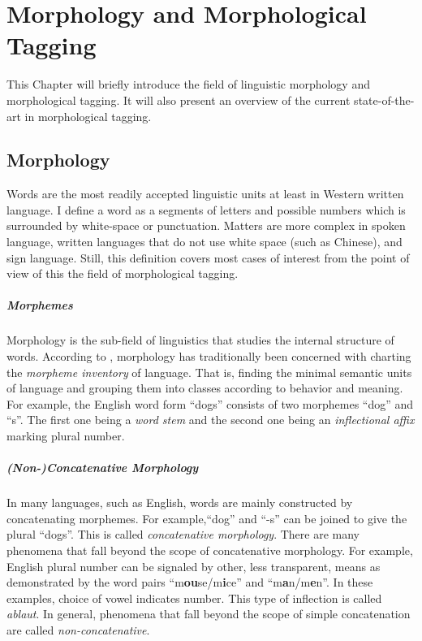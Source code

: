 \chapter{Morphology and Morphological Tagging}
\label{chap:morphology}

This Chapter will briefly introduce the field of linguistic
morphology and morphological tagging. It will also present an overview
of the current state-of-the-art in morphological tagging.

\section{Morphology}

Words are the most readily accepted linguistic units at least in
Western written language. I define a word as a segments of letters
and possible numbers which is surrounded by white-space or
punctuation. Matters are more complex in spoken language, written
languages that do not use white space (such as Chinese), and sign
language. Still, this definition covers most cases of interest from
the point of view of this the field of morphological tagging.

\paragraph{Morphemes} Morphology is the sub-field of linguistics that
studies the internal structure of words. According to \cite{Bybee85},
morphology has traditionally been concerned with charting the {\it
  morpheme inventory} of language. That is, finding the minimal
semantic units of language and grouping them into classes according to
behavior and meaning. For example, the English word form ``dogs''
consists of two morphemes ``dog'' and ``s''. The first one being a
{\it word stem} and the second one being an {\it inflectional affix}
marking plural number.

\paragraph{(Non-)Concatenative Morphology} In many languages, such as
English, words are mainly constructed by concatenating morphemes. For
example,``dog'' and ``-s'' can be joined to give the plural
``dogs''. This is called {\it concatenative morphology}. There are
many phenomena that fall beyond the scope of concatenative
morphology. For example, English plural number can be signaled by
other, less transparent, means as demonstrated by the word pairs
``m{\bf ou}se/m{\bf i}ce'' and ``m{\bf a}n/m{\bf e}n''. In these
examples, choice of vowel indicates number. This type of inflection is
called {\it ablaut}. In general, phenomena that fall beyond the scope
of simple concatenation are called {\it non-concatenative}.

